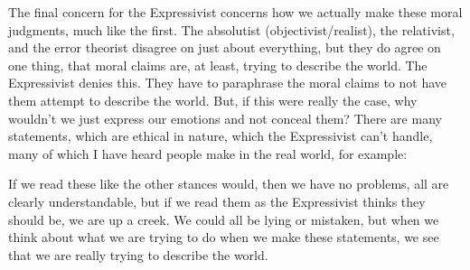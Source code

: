 The final concern for the Expressivist concerns how we actually make these moral judgments, much like the first. The absolutist (objectivist/realist), the relativist, and the error theorist disagree on just about everything, but they do agree on one thing, that moral claims are, at least, trying to describe the world. The Expressivist denies this. They have to paraphrase the moral claims to not have them attempt to describe the world. But, if this were really the case, why wouldn’t we just express our emotions and not conceal them? There are many statements, which are ethical in nature, which the Expressivist can't handle, many of which I have heard people make in the real world, for example:

If we read these like the other stances would, then we have no problems, all are clearly understandable, but if we read them as the Expressivist thinks they should be, we are up a creek. We could all be lying or mistaken, but when we think about what we are trying to do when we make these statements, we see that we are really trying to describe the world. 